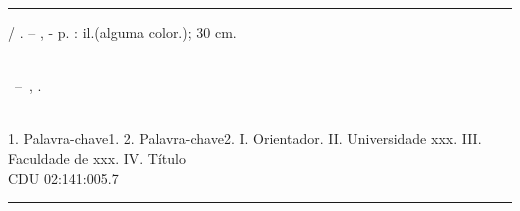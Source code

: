 \begin{fichacatalografica}
    \sffamily
    \vspace*{15cm}    %
    \hrule       %
    \begin{center}    %
        \begin{minipage}[c]{12.5cm} %
            \imprimirautor
            \hspace{0.5cm} \imprimirtitulo / \imprimirautor. --
            \imprimirlocal, \imprimirdata-
            \hspace{0.5cm} \pageref{LastPage} p. : il.(alguma color.); 30 cm.\\
            \hspace{0.5cm} \imprimirorientadorRotulo \imprimirorientador\\
            \hspace{0.5cm}
            \parbox[t]{\textwidth}{\imprimirtipotrabalho~--~\imprimirinstituicao,
            \imprimirdata.}\\
            \hspace{0.5cm}
            1. Palavra-chave1.
            2. Palavra-chave2.
            I. Orientador.
            II. Universidade xxx.
            III. Faculdade de xxx.
            IV. Título\\
            \hspace{8.75cm} CDU 02:141:005.7\\
        \end{minipage}
    \end{center}
\hrule
\end{fichacatalografica}